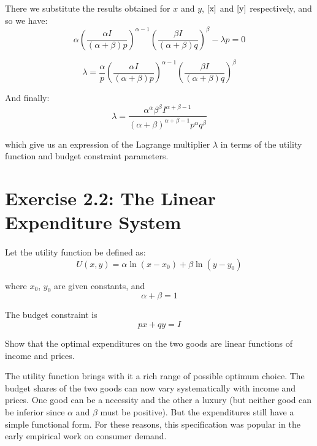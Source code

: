 \documentclass{article}
\begin{document}
There we substitute the results obtained for $x$ and $y$, $\ref{x}$ and $\ref{y}$ respectively, and so we have:
  \begin{equation}
    \alpha \left( \frac{\alpha I}{(\alpha + \beta)p} \right)^{\alpha - 1} \left( \frac{\beta I}{(\alpha + \beta)q} \right)^\beta - \lambda p = 0
  \end{equation}

  \begin{equation}
    \lambda = \frac{\alpha}{p} \left( \frac{\alpha I}{(\alpha + \beta)p} \right)^{\alpha - 1} \left( \frac{\beta I}{(\alpha + \beta)q} \right)^\beta
  \end{equation}

And finally:
 \begin{equation}
    \lambda = \frac{\alpha^\alpha \beta^\beta I^{\alpha + \beta - 1}}{(\alpha + \beta)^{\alpha + \beta - 1}p^\alpha q^\beta}
  \end{equation}

\medskip

which give us an expression of the Lagrange multiplier $\lambda$ in terms of the utility function and budget constraint parameters. 

\bigskip

\section*{Exercise 2.2: The Linear Expenditure System}

\paragraph{}

Let the utility function be defined as:
\begin{equation}
  U(x, y) = \alpha \ln (x - x_0) + \beta \ln (y - y_0)
\end{equation}

where $x_0$, $y_0$ are given constants, and
\begin{equation}\label{res}
  \alpha + \beta = 1
\end{equation}

The budget constraint is
  \begin{equation}
    px + qy = I
  \end{equation}

Show that the optimal expenditures on the two goods are linear functions of income and prices.

The utility function brings with it a rich range of possible optimum choice. The budget shares of the two goods can now vary systematically with income and prices. One good can be a necessity and the other a luxury (but neither good can be inferior since $\alpha$ and $\beta$ must be positive). But the expenditures still have a simple functional form. For these reasons, this specification was popular in the early empirical work on consumer demand.
\end{document}
